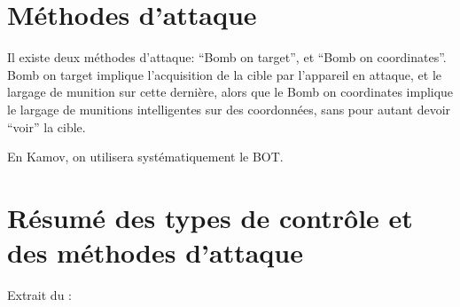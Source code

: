 \section{Méthodes d’attaque}
\e
    \item
    Il existe deux méthodes d’attaque: “Bomb on target”, et “Bomb on coordinates”. Bomb on target implique l’acquisition de la cible par l’appareil en attaque, et le largage de munition sur cette dernière, alors que le Bomb on coordinates implique le largage de munitions intelligentes sur des coordonnées, sans pour autant devoir “voir” la cible.
    \item En Kamov, on utilisera systématiquement le BOT.
\ed

\section{Résumé des types de contrôle et des méthodes d’attaque}
\e
    \item
    Extrait du \jp:
\ed
{}



